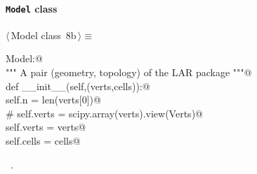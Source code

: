\documentclass[11pt,oneside]{article}	%
\begin{document}
\paragraph{\texttt{Model} class}
\begin{flushleft} \small \label{scrap24}
\protect{}$\langle\,$Model class\nobreak\ {\footnotesize 8b}$\,\rangle\equiv$
\vspace{-1ex}
\begin{list}{}{} \item
\mbox{}\verb@class Model:@\\
\mbox{}\verb@   """ A pair (geometry, topology) of the LAR package """@\\
\mbox{}\verb@   def __init__(self,(verts,cells)):@\\
\mbox{}\verb@      self.n = len(verts[0])@\\
\mbox{}\verb@      # self.verts = scipy.array(verts).view(Verts)@\\
\mbox{}\verb@      self.verts = verts@\\
\mbox{}\verb@      self.cells = cells@\\
\mbox{}\verb@@{\NWsep}
\end{list}
\vspace{-1ex}
\footnotesize\addtolength{\baselineskip}{-1ex}
\begin{list}{}{\setlength{\itemsep}{-\parsep}\setlength{\itemindent}{-\leftmargin}}
\item \NWtxtMacroRefIn\ .
\end{list}
\end{flushleft}
\end{document}
